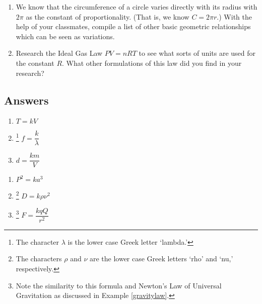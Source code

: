 \documentclass{ximera}
\begin{document}
\begin{enumerate}
\begin{enumerate}
\end{enumerate}

\item We know that the circumference of a circle varies directly with its radius with $2\pi$ as the constant of proportionality. (That is, we know $C = 2\pi r.$)  With the help of your classmates, compile a list of other basic geometric relationships which can be seen as variations.

\item \label{idealgasexercise} Research the Ideal Gas Law $PV = nRT$ to see what sorts of units are used for the constant $R$.  What other formulations of this law did you find in your research?

\end{enumerate}

\newpage

\subsection{Answers}

\begin{multicols}{3}
\begin{enumerate}

\item $T = k V$

\item \hspace{-.1in} \footnote{The character $\lambda$ is the lower case Greek letter `lambda.'} $f = \dfrac{k}{\lambda}$

\item $d = \dfrac{k m}{V}$ 

\setcounter{HW}{\value{enumi}}
\end{enumerate}
\end{multicols}


\begin{multicols}{3}
\begin{enumerate}
\setcounter{enumi}{\value{HW}}

\item $P^2 = k a^3$

\item \hspace{-.1in} \footnote{The characters $\rho$ and $\nu$ are the lower case Greek letters `rho' and `nu,' respectively.} $D = k \rho \nu^2$

\item \hspace{-.1in} \footnote{Note the similarity to this formula and Newton's Law of Universal Gravitation as discussed in Example \ref{gravitylaw}.}  $F = \dfrac{kqQ}{r^2}$   

\setcounter{HW}{\value{enumi}}
\end{enumerate}
\end{multicols}
\end{document}
